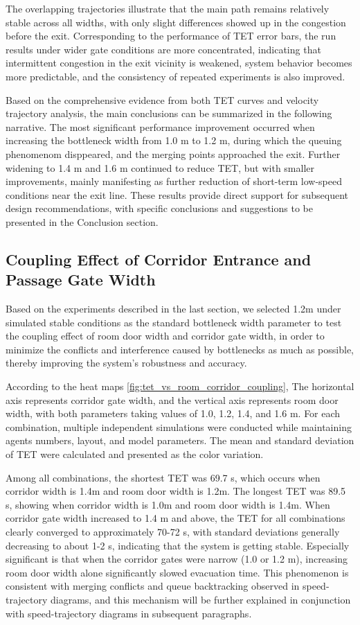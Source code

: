 The overlapping trajectories illustrate that the main path remains relatively stable across all widths, with only slight differences showed up in the congestion before the exit. Corresponding to the performance of TET error bars, the run results under wider gate conditions are more concentrated, indicating that intermittent congestion in the exit vicinity is weakened, system behavior becomes more predictable, and the consistency of repeated experiments is also improved.

Based on the comprehensive evidence from both TET curves and velocity trajectory analysis, the main conclusions can be summarized in the following narrative. The most significant performance improvement occurred when increasing the bottleneck width from 1.0 m to 1.2 m, during which the queuing phenomenom disppeared, and the merging points approached the exit. Further widening to 1.4 m and 1.6 m continued to reduce TET, but with smaller improvements, mainly manifesting as further reduction of short-term low-speed conditions near the exit line.  These results provide direct support for subsequent design recommendations, with specific conclusions and suggestions to be presented in the Conclusion section.

\subsection{Coupling Effect of Corridor Entrance and Passage Gate Width}
Based on the experiments described in the last section, we selected 1.2m under simulated stable conditions as the standard bottleneck width parameter to test the coupling effect of room door width and corridor gate width, in order to minimize the conflicts and interference caused by bottlenecks as much as possible, thereby improving the system's robustness and accuracy.

According to the heat maps \ref{fig:tet_vs_room_corridor_coupling}, The horizontal axis represents corridor gate width, and the vertical axis represents room door width, with both parameters taking values of 1.0, 1.2, 1.4, and 1.6 m. For each combination, multiple independent simulations were conducted while maintaining agents numbers, layout, and model parameters. The mean and standard deviation of TET were calculated and presented as the color variation.

Among all combinations, the shortest TET was 69.7 s, which occurs when corridor width is 1.4m and room door width is 1.2m. The longest TET was 89.5 s, showing when corridor width is 1.0m and room door width is 1.4m. When corridor gate width increased to 1.4 m and above, the TET for all combinations clearly converged to approximately 70-72 s, with standard deviations generally decreasing to about 1-2 s, indicating that the system is getting stable. Especially significant is that when the corridor gates were narrow (1.0 or 1.2 m), increasing room door width alone significantly slowed evacuation time. This phenomenon is consistent with merging conflicts and queue backtracking observed in speed-trajectory diagrams, and this mechanism will be further explained in conjunction with speed-trajectory diagrams in subsequent paragraphs.

